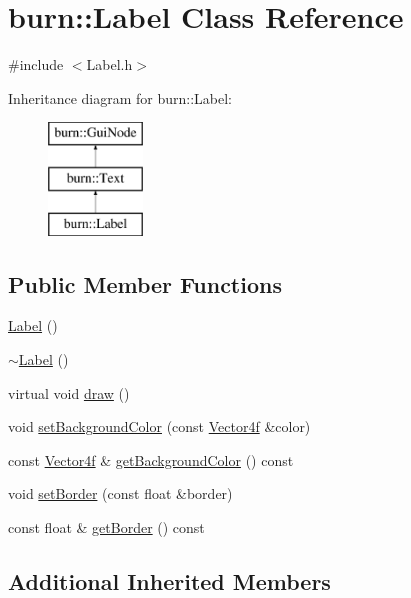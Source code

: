 \hypertarget{classburn_1_1_label}{\section{burn\-:\-:Label Class Reference}
\label{classburn_1_1_label}
}


{\ttfamily \#include $<$Label.\-h$>$}

Inheritance diagram for burn\-:\-:Label\-:\begin{figure}[H]
\begin{center}
\leavevmode
\includegraphics[height=3.000000cm]{classburn_1_1_label}
\end{center}
\end{figure}
\subsection*{Public Member Functions}
\begin{DoxyCompactItemize}
\item 
\hyperlink{classburn_1_1_label_a2fa54075b309e74c2bf0b8e1cf987404}{Label} ()
\item 
\hyperlink{classburn_1_1_label_a506c36c2a01f59620390597efb3014f8}{$\sim$\-Label} ()
\item 
virtual void \hyperlink{classburn_1_1_label_a23eaa7ccb0a68e6691a89133cb4254d5}{draw} ()
\item 
void \hyperlink{classburn_1_1_label_af0f6b8afde28a84cd81bc807c165b0ed}{set\-Background\-Color} (const \hyperlink{namespaceburn_a58a411b9d83c7970518a9250c1c78068}{Vector4f} \&color)
\item 
const \hyperlink{namespaceburn_a58a411b9d83c7970518a9250c1c78068}{Vector4f} \& \hyperlink{classburn_1_1_label_a0b89964384230c91c67a51f485ba39f7}{get\-Background\-Color} () const 
\item 
void \hyperlink{classburn_1_1_label_a13bbf6cc1170fd4ce2115a419ae937d7}{set\-Border} (const float \&border)
\item 
const float \& \hyperlink{classburn_1_1_label_a1c8c5359f4d4430f62fb19cb66b71829}{get\-Border} () const 
\end{DoxyCompactItemize}
\subsection*{Additional Inherited Members}


